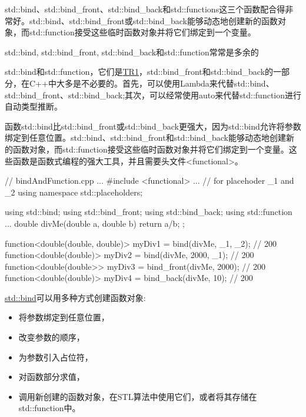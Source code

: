 
std::bind、std::bind\_front、std::bind\_back和std::functions这三个函数配合得非常好。std::bind、std::bind\_front或std::bind\_back能够动态地创建新的函数对象，而std::function接受这些临时函数对象并将它们绑定到一个变量。

\begin{myTip}{std::bind, std::bind\_front, std::bind\_back和std::function常常是多余的}
	
std::bind和std::function，它们是\href{https://en.wikipedia.org/wiki/C%2B%2B_Technical_Report_1}{TR1}，std::bind\_front和std::bind\_back的一部分，在C++中大多是不必要的。首先，可以使用Lambda来代替std::bind、std::bind\_front、std::bind\_back;其次，可以经常使用auto来代替std::function进行自动类型推断。
	
\end{myTip}


函数std::bind比std::bind\_front或std::bind\_back更强大，因为std::bind允许将参数绑定到任意位置。std::bind、std::bind\_front和std::bind\_back能够动态地创建新的函数对象，而std::function接受这些临时函数对象并将它们绑定到一个变量。这些函数是函数式编程的强大工具，并且需要头文件<functional>。


\begin{cpp}
// bindAndFunction.cpp
...
#include <functional>
...
// for placehoder _1 and _2
using namespace std::placeholders;

using std::bind;
using std::bind_front;
using std::bind_back;
using std::function
...
double divMe(double a, double b){ return a/b; };

function<double(double, double)> myDiv1 = bind(divMe, _1, _2); // 200
function<double(double)> myDiv2 = bind(divMe, 2000, _1); // 200
function<double(double>> myDiv3 = bind_front(divMe, 2000); // 200
function<double(double)> myDiv4 = bind_back(divMe, 10); // 200
\end{cpp}

\href{http://en.cppreference.com/w/cpp/utility/functional/bind}{std::bind}可以用多种方式创建函数对象:

\begin{itemize}
\item 
将参数绑定到任意位置，

\item 
改变参数的顺序，

\item 
为参数引入占位符，

\item 
对函数部分求值，

\item 
调用新创建的函数对象，在STL算法中使用它们，或者将其存储在std::function中。
\end{itemize}


